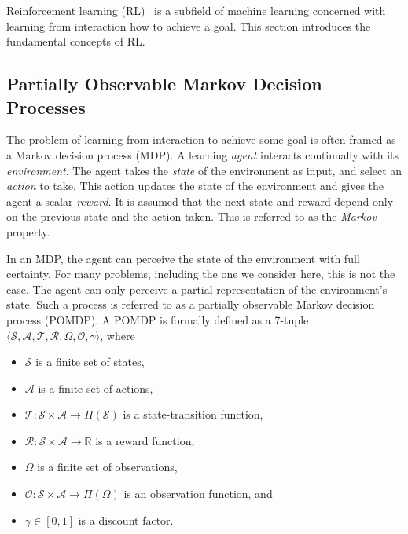 
Reinforcement learning (RL)~\cite{sutton_reinforcement_2018} is a subfield of machine learning concerned with learning from interaction how to achieve a goal.
This section introduces the fundamental concepts of RL.

\subsection{Partially Observable Markov Decision Processes}

The problem of learning from interaction to achieve some goal is often framed as a Markov decision process (MDP).
A learning \textit{agent} interacts continually with its \textit{environment}.
The agent takes the \textit{state} of the environment as input, and select an \textit{action} to take.
This action updates the state of the environment and gives the agent a scalar \textit{reward}.
It is assumed that the next state and reward depend only on the previous state and the action taken.
This is referred to as the \textit{Markov} property.~\cite{kaelbling_pomdp_1998}

In an MDP, the agent can perceive the state of the environment with full certainty.
For many problems, including the one we consider here, this is not the case.
The agent can only perceive a partial representation of the environment's state.
Such a process is referred to as a partially observable Markov decision process (POMDP).
A POMDP is formally defined as a 7-tuple \(\langle \mathcal{S}, \mathcal{A}, \mathcal{T}, \mathcal{R}, \Omega, \mathcal{O}, \gamma \rangle\), where

\begin{itemize}
    \item \(\mathcal{S}\) is a finite set of states,
    \item \(\mathcal{A}\) is a finite set of actions,
    \item \(\mathcal{T}: \mathcal{S} \times \mathcal{A} \rightarrow \Pi(\mathcal{S})\) is a state-transition function,
    \item \(\mathcal{R}: \mathcal{S} \times \mathcal{A} \rightarrow \mathbb{R}\) is a reward function,
    \item \(\Omega\) is a finite set of observations,
    \item \(\mathcal{O}: \mathcal{S} \times \mathcal{A} \rightarrow \Pi(\Omega)\) is an observation function, and
    \item \(\gamma \in [0, 1]\) is a discount factor.
\end{itemize}

